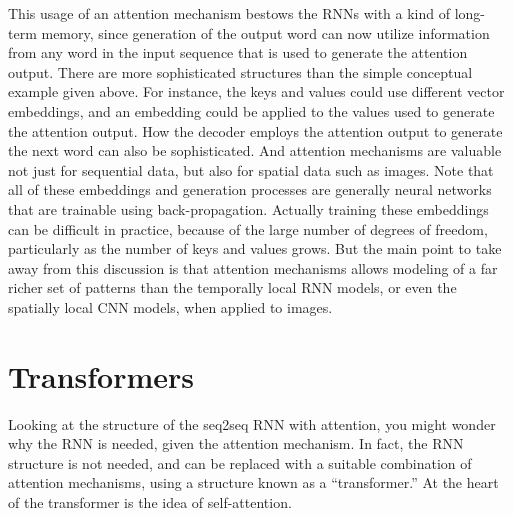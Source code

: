 This usage of an attention mechanism bestows the RNNs with a kind of long-term memory, since generation of the output word can now utilize information from any word in the input sequence that is used to generate the attention output.  There are more sophisticated structures than the simple conceptual example given above.  For instance, the keys and values could use different vector embeddings, and an embedding could be applied to the values used to generate the attention output.  How the decoder employs the attention output to generate the next word can also be sophisticated.  And attention mechanisms are valuable not just for sequential data, but also for spatial data such as images.  Note that all of these embeddings and generation processes are generally neural networks that are trainable using back-propagation.  Actually training these embeddings can be difficult in practice, because of the large number of degrees of freedom, particularly as the number of keys and values grows.  But the main point to take away from this discussion is that attention mechanisms allows modeling of a far richer set of patterns than the temporally local RNN models, or even the spatially local CNN models, when applied to images.


\section{Transformers}
\label{sec:transformers}

Looking at the structure of the seq2seq RNN with attention, you might wonder why the RNN is needed, given the attention mechanism.  In fact, the RNN structure is not needed, and can be replaced with a suitable combination of attention mechanisms, using a structure known as a ``transformer.''  At the heart of the transformer is the idea of self-attention.

